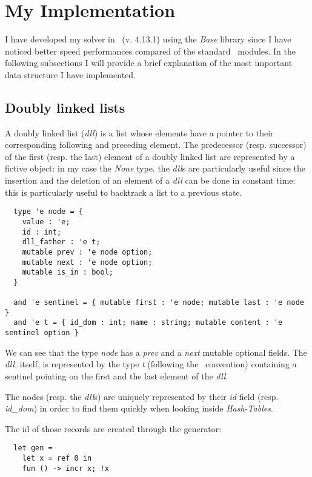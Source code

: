 \documentclass{rapport}
\begin{document}
\section{My Implementation}

I have developed my solver in \ml\ (v. 4.13.1) using the \textit{Base} library since I have noticed better speed performances compared of the standard \ml\ modules. In the following subsections I will provide a brief explanation of the most important data structure I have implemented.

\subsection{Doubly linked lists}

A doubly linked list (\textit{dll}) is a list whose elements have a pointer to their corresponding following and preceding element. The predecessor (resp. successor) of the first (resp. the last) element of a doubly linked list are represented by a fictive object: in my case the \textit{None} type. the \textit{dll}s are particularly useful since the insertion and the deletion of an element of a \textit{dll} can be done in constant time: this is particularly useful to backtrack a list to a previous state.

\begin{verbatim}
  type 'e node = {
    value : 'e;
    id : int;
    dll_father : 'e t;
    mutable prev : 'e node option;
    mutable next : 'e node option;
    mutable is_in : bool;
  }
  
  and 'e sentinel = { mutable first : 'e node; mutable last : 'e node }
  and 'e t = { id_dom : int; name : string; mutable content : 'e sentinel option }
\end{verbatim}

We can see that the type \textit{node} has a \textit{prev} and a \textit{next} mutable optional fields. The \textit{dll}, itself, is represented by the type \textit{t} (following the \ml\ convention) containing a sentinel pointing on the first and the last element of the \textit{dll}.

The nodes (resp. the \textit{dll}s) are uniquely represented by their \textit{id} field (resp. \textit{id\_dom}) in order to find them quickly when looking inside \textit{Hash-Tables}.

The id of those records are created through the generator:

\begin{verbatim}
  let gen =
    let x = ref 0 in
    fun () -> incr x; !x
\end{verbatim}
\end{document}
